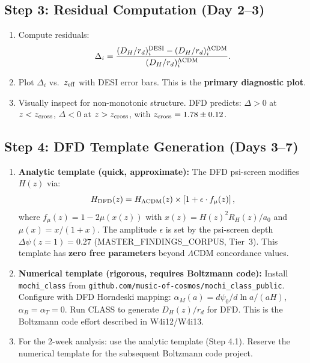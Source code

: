 \documentclass[11pt]{article}
\newcommand{\LCDM}{\Lambda\text{CDM}}
\begin{document}
\subsection{Step 3: Residual Computation (Day 2--3)}

\begin{enumerate}[label=\textbf{3.\arabic*:}, nosep]
\item Compute residuals:
  \begin{equation}
  \Delta_i = \frac{(D_H/r_d)_i^{\rm DESI} - (D_H/r_d)_i^{\LCDM}}
  {(D_H/r_d)_i^{\LCDM}}.
  \end{equation}

\item Plot $\Delta_i$ vs.\ $z_{\rm eff}$ with DESI error bars. This is
  the \textbf{primary diagnostic plot}.

\item Visually inspect for non-monotonic structure. DFD predicts:
  $\Delta > 0$ at $z < z_{\rm cross}$, $\Delta < 0$ at $z > z_{\rm cross}$,
  with $z_{\rm cross} = 1.78 \pm 0.12$.
\end{enumerate}

\subsection{Step 4: DFD Template Generation (Days 3--7)}

\begin{enumerate}[label=\textbf{4.\arabic*:}, nosep]
\item \textbf{Analytic template (quick, approximate):}
  The DFD psi-screen modifies $H(z)$ via:
  \begin{equation}
  H_{\rm DFD}(z) = H_{\LCDM}(z) \times
  \left[1 + \epsilon \cdot f_\mu(z)\right],
  \end{equation}
  where $f_\mu(z) = 1 - 2\mu(x(z))$ with $x(z) = H(z)^2 R_H(z) / a_0$
  and $\mu(x) = x/(1+x)$. The amplitude $\epsilon$ is set by the
  psi-screen depth $\Delta\psi(z=1) = 0.27$ (MASTER\_FINDINGS\_CORPUS,
  Tier~3). This template has \textbf{zero free parameters} beyond
  $\LCDM$ concordance values.

\item \textbf{Numerical template (rigorous, requires Boltzmann code):}
  Install \texttt{mochi\_class} from
  \texttt{github.com/music-of-cosmos/mochi\_class\_public}.
  Configure with DFD Horndeski mapping:
  $\alpha_M(a) = d\psi_0/d\ln a / (aH)$, $\alpha_B = \alpha_T = 0$.
  Run CLASS to generate $D_H(z)/r_d$ for DFD. This is the Boltzmann
  code effort described in W4i12/W4i13.

\item For the 2-week analysis: use the analytic template (Step 4.1).
  Reserve the numerical template for the subsequent Boltzmann code
  project.
\end{enumerate}
\end{document}
